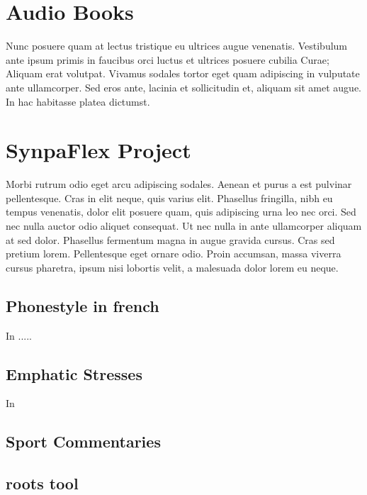 \section{Audio Books}

Nunc posuere quam at lectus tristique eu ultrices augue venenatis. Vestibulum ante ipsum primis in faucibus orci luctus et ultrices posuere cubilia Curae; Aliquam erat volutpat. Vivamus sodales tortor eget quam adipiscing in vulputate ante ullamcorper. Sed eros ante, lacinia et sollicitudin et, aliquam sit amet augue. In hac habitasse platea dictumst.


\section{SynpaFlex Project}
Morbi rutrum odio eget arcu adipiscing sodales. Aenean et purus a est pulvinar pellentesque. Cras in elit neque, quis varius elit. Phasellus fringilla, nibh eu tempus venenatis, dolor elit posuere quam, quis adipiscing urna leo nec orci. Sed nec nulla auctor odio aliquet consequat. Ut nec nulla in ante ullamcorper aliquam at sed dolor. Phasellus fermentum magna in augue gravida cursus. Cras sed pretium lorem. Pellentesque eget ornare odio. Proin accumsan, massa viverra cursus pharetra, ipsum nisi lobortis velit, a malesuada dolor lorem eu neque.

\subsection{Phonestyle in french}
In \citep{AnneCatherine2010PhoneStyle} .....
\subsection{Emphatic Stresses}
In \citep{Brognaux2014SynthesizingSC}
\subsection{Sport Commentaries}
\citep{brognaux}
\subsection{roots tool}
\citep{chevelu:hal-00974628}
